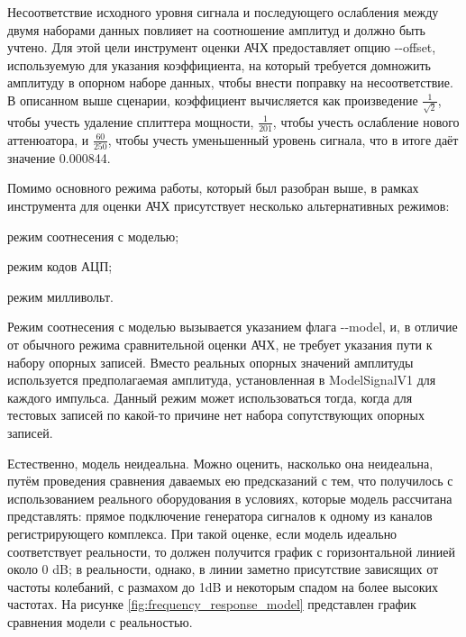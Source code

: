 \documentclass{report}
\begin{document}

Несоответствие исходного уровня сигнала и последующего ослабления между двумя наборами данных повлияет на соотношение амплитуд и должно быть учтено. Для этой цели инструмент оценки АЧХ предоставляет опцию -{}-offset, используемую для указания коэффициента, на который требуется домножить амплитуду в опорном наборе данных, чтобы внести поправку на несоответствие. В описанном выше сценарии, коэффициент вычисляется как произведение $\frac{1}{\sqrt{2}}$, чтобы учесть удаление сплиттера мощности, $\frac{1}{201}$, чтобы учесть ослабление нового аттенюатора, и $\frac{60}{250}$, чтобы учесть уменьшенный уровень сигнала, что в итоге даёт значение 0.000844.

Помимо основного режима работы, который был разобран выше, в рамках инструмента для оценки АЧХ присутствует несколько альтернативных режимов:

\begin{enummarker}
    \item режим соотнесения с моделью;
    \item режим кодов АЦП;
    \item режим милливольт.
\end{enummarker}

Режим соотнесения с моделью вызывается указанием флага -{}-model, и, в отличие от обычного режима сравнительной оценки АЧХ, не требует указания пути к набору опорных записей. Вместо реальных опорных значений амплитуды используется предполагаемая амплитуда, установленная в ModelSignalV1 для каждого импульса. Данный режим может использоваться тогда, когда для тестовых записей по какой-то причине нет набора сопутствующих опорных записей.

Естественно, модель неидеальна. Можно оценить, насколько она неидеальна, путём проведения сравнения даваемых ею предсказаний с тем, что получилось с использованием реального оборудования в условиях, которые модель рассчитана представлять: прямое подключение генератора сигналов к одному из каналов регистрирующего комплекса. При такой оценке, если модель идеально соответствует реальности, то должен получится график с горизонтальной линией около 0 dB; в реальности, однако, в линии заметно присутствие зависящих от частоты колебаний, с размахом до 1dB и некоторым спадом на более высоких частотах. На рисунке \ref{fig:frequency_response_model} представлен график сравнения модели с реальностью.
\end{document}
